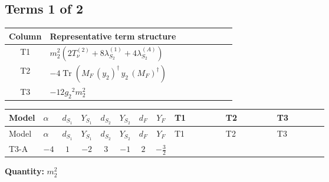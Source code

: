 \documentclass[8pt]{article}
\begin{document}
\begin{landscape}
\subsection*{Terms 1 of 2}
\begin{center}
\begin{tabular}{@{}c >{\raggedright\arraybackslash}p{0.82\linewidth}@{}}
\toprule
Column & Representative term structure \\
\midrule
T1 & \(\displaystyle {m_2^2} (2 T_{\nu}^{(2)}+8 {\lambda_{S_2}^{(1)}}+4 {\lambda_{S_2}^{(A)}})\) \\
\midrule
T2 & \(\displaystyle -4 \operatorname{Tr}\!\left({M_F}\,\left({y_2}\right)^{\dagger}\,{y_2}\,\left({M_F}\right)^{\dagger}\right)\) \\
\midrule
T3 & \(\displaystyle -12 {g_2}^2 {m_2^2}\) \\
\midrule
\bottomrule
\end{tabular}
\end{center}
\smallskip
\tiny
\begin{longtable}{@{}llcccccc >{\raggedright\arraybackslash}p{0.21\linewidth} >{\raggedright\arraybackslash}p{0.21\linewidth} >{\raggedright\arraybackslash}p{0.21\linewidth}@{}}
\toprule
Model & $\alpha$ & $d_{S_1}$ & $Y_{S_1}$ & $d_{S_2}$ & $Y_{S_2}$ & $d_F$ & $Y_F$ & T1 & T2 & T3 \\
\midrule
\endfirsthead
\toprule
Model & $\alpha$ & $d_{S_1}$ & $Y_{S_1}$ & $d_{S_2}$ & $Y_{S_2}$ & $d_F$ & $Y_F$ & T1 & T2 & T3 \\
\midrule
\endhead
T3-A & $-4$ & $1$ & $-2$ & $3$ & $-1$ & $2$ & $-\frac{3}{2}$ & \scriptsize\adjustbox{max width=\linewidth}{$\begin{gathered} {m_2^2} (2 T_{\nu}^{(2)}+8 {\lambda_{S_2}^{(1)}}+4 {\lambda_{S_2}^{(A)}})\end{gathered}$} & \scriptsize\adjustbox{max width=\linewidth}{$\begin{gathered} -4 \operatorname{Tr}\!\left({M_F}\,\left({y_2}\right)^{\dagger}\,{y_2}\,\left({M_F}\right)^{\dagger}\right)\end{gathered}$} & \scriptsize\adjustbox{max width=\linewidth}{$\begin{gathered} -12 {g_2}^2 {m_2^2}\end{gathered}$} \\
\midrule
\bottomrule
\end{longtable}
\clearpage
\noindent\textbf{Quantity: }$m_2^2$\par\smallskip

\end{landscape}
\end{document}

